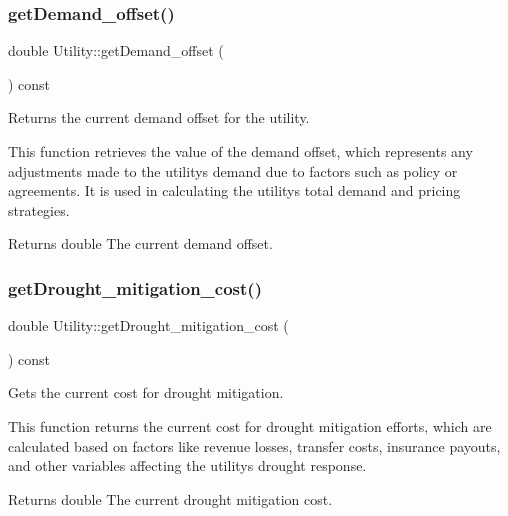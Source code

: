 \subsubsection{\texorpdfstring{get\+Demand\+\_\+offset()}{getDemand\_offset()}}
{\footnotesize\ttfamily double Utility\+::get\+Demand\+\_\+offset (\begin{DoxyParamCaption}{ }\end{DoxyParamCaption}) const}



Returns the current demand offset for the utility. 

This function retrieves the value of the demand offset, which represents any adjustments made to the utility\textquotesingle{}s demand due to factors such as policy or agreements. It is used in calculating the utility\textquotesingle{}s total demand and pricing strategies.

\begin{DoxyReturn}{Returns}
double The current demand offset. 
\end{DoxyReturn}
\mbox{\label{classUtility_a27dc0aeabdcb9fdb5a7d388e67e905f8}} 
\subsubsection{\texorpdfstring{get\+Drought\+\_\+mitigation\+\_\+cost()}{getDrought\_mitigation\_cost()}}
{\footnotesize\ttfamily double Utility\+::get\+Drought\+\_\+mitigation\+\_\+cost (\begin{DoxyParamCaption}{ }\end{DoxyParamCaption}) const}



Gets the current cost for drought mitigation. 

This function returns the current cost for drought mitigation efforts, which are calculated based on factors like revenue losses, transfer costs, insurance payouts, and other variables affecting the utility\textquotesingle{}s drought response.

\begin{DoxyReturn}{Returns}
double The current drought mitigation cost. 
\end{DoxyReturn}
\mbox{\label{classUtility_a9ca028b10b1c466e010dcacca6a0b24e}} 
